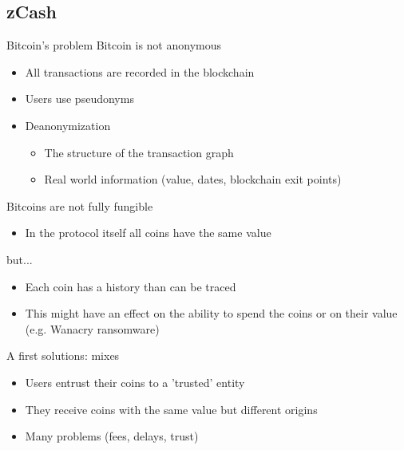 \documentclass[handout]{beamer}
\begin{document}
\subsection{zCash}
\begin{frame}[allowframebreaks]{Bitcoin's problem}
    Bitcoin is not anonymous
    \begin{itemize}
        \item All transactions are recorded in the blockchain
        \item Users use pseudonyms
        \item Deanonymization
        \begin{itemize}
            \item The structure of the transaction graph
            \item Real world information (value, dates, blockchain exit points) 
        \end{itemize} 
    \end{itemize}
    Bitcoins are not fully fungible
    \begin{itemize}
        \item In the protocol itself all coins have the same value
    \end{itemize}
    
    but...
    \framebreak

   
    \begin{itemize}
        \item Each coin has a history than can be traced
        \item This might have an effect on the ability to spend the coins or on their value (e.g. Wanacry ransomware)
    \end{itemize}

    A first solutions: mixes
    \begin{itemize}
        \item Users entrust their coins to a 'trusted' entity
        \item They receive coins with the same value but different origins
        \item Many problems (fees, delays, trust)
    \end{itemize}
\end{frame}
\end{document}
